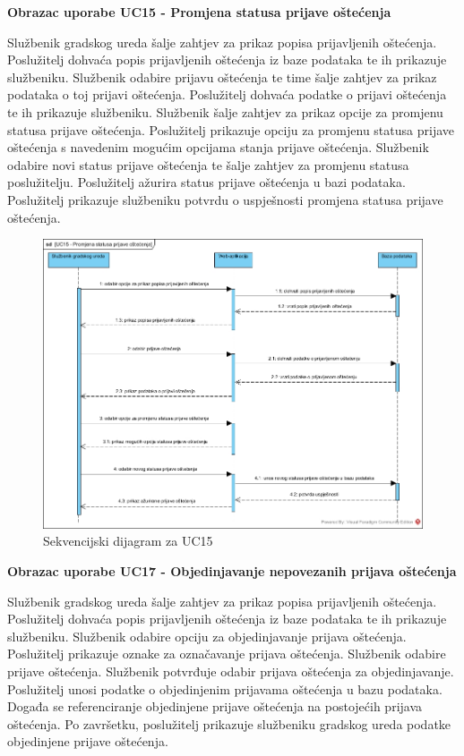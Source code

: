 \noindent \textbf{Obrazac uporabe UC15 - Promjena statusa prijave oštećenja}

Službenik gradskog ureda šalje zahtjev za prikaz popisa prijavljenih oštećenja. Poslužitelj dohvaća popis prijavljenih oštećenja iz baze 
podataka te ih prikazuje službeniku. Službenik odabire prijavu oštećenja te time šalje zahtjev za prikaz podataka o toj prijavi oštećenja. 
Poslužitelj dohvaća podatke o prijavi oštećenja te ih prikazuje službeniku. Službenik šalje zahtjev za prikaz opcije za promjenu statusa prijave
oštećenja. Poslužitelj prikazuje opciju za promjenu statusa prijave oštećenja s navedenim mogućim opcijama stanja prijave oštećenja. Službenik
odabire novi status prijave oštećenja te šalje zahtjev za promjenu statusa poslužitelju. Poslužitelj ažurira status prijave oštećenja u bazi
podataka. Poslužitelj prikazuje službeniku potvrdu o uspješnosti promjena statusa prijave oštećenja.

\begin{figure}[H]
	\includegraphics[scale=0.5]{slike/UC15_sekvencijski.jpg} %
	\centering
	\caption{Sekvencijski dijagram za UC15}
	\label{fig:SekvencijskiDijagramPromjenaStatusaPrijaveOštećenja}
\end{figure}

\noindent \textbf{Obrazac uporabe UC17 - Objedinjavanje nepovezanih prijava oštećenja}

Službenik gradskog ureda šalje zahtjev za prikaz popisa prijavljenih oštećenja. Poslužitelj dohvaća popis prijavljenih oštećenja iz baze 
podataka te ih prikazuje službeniku. Službenik odabire opciju za objedinjavanje prijava oštećenja. Poslužitelj prikazuje oznake za označavanje
prijava oštećenja. Službenik odabire prijave oštećenja. Službenik potvrđuje odabir prijava oštećenja za objedinjavanje. Poslužitelj unosi
podatke o objedinjenim prijavama oštećenja u bazu podataka. Događa se referenciranje objedinjene prijave oštećenja na postojećih prijava 
oštećenja. Po završetku, poslužitelj prikazuje službeniku gradskog ureda podatke objedinjene prijave oštećenja. 


